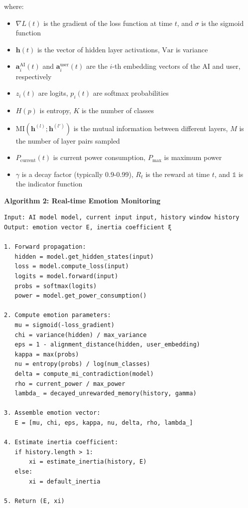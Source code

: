 \documentclass[12pt,a4paper]{article}
\theoremstyle{plain}
\newcommand{\ind}{\mathds{1}}
\begin{document}
where:
\begin{itemize}
    \item $\nabla L(t)$ is the gradient of the loss function at time $t$, and $\sigma$ is the sigmoid function
    \item $\mathbf{h}(t)$ is the vector of hidden layer activations, $\text{Var}$ is variance
    \item $\mathbf{a}_i^{\text{AI}}(t)$ and $\mathbf{a}_i^{\text{user}}(t)$ are the $i$-th embedding vectors of the AI and user, respectively
    \item $z_i(t)$ are logits, $p_i(t)$ are softmax probabilities
    \item $H(p)$ is entropy, $K$ is the number of classes
    \item $\text{MI}(\mathbf{h}^{(l)}; \mathbf{h}^{(l')})$ is the mutual information between different layers, $M$ is the number of layer pairs sampled
    \item $P_{\text{current}}(t)$ is current power consumption, $P_{\text{max}}$ is maximum power
    \item $\gamma$ is a decay factor (typically 0.9-0.99), $R_t$ is the reward at time $t$, and $\ind$ is the indicator function
\end{itemize}

\textbf{Algorithm 2: Real-time Emotion Monitoring}
\begin{verbatim}
Input: AI model model, current input input, history window history
Output: emotion vector E, inertia coefficient ξ

1. Forward propagation:
   hidden = model.get_hidden_states(input)
   loss = model.compute_loss(input)
   logits = model.forward(input)
   probs = softmax(logits)
   power = model.get_power_consumption()
   
2. Compute emotion parameters:
   mu = sigmoid(-loss_gradient)
   chi = variance(hidden) / max_variance
   eps = 1 - alignment_distance(hidden, user_embedding)
   kappa = max(probs)
   nu = entropy(probs) / log(num_classes)
   delta = compute_mi_contradiction(model)
   rho = current_power / max_power
   lambda_ = decayed_unrewarded_memory(history, gamma)
   
3. Assemble emotion vector:
   E = [mu, chi, eps, kappa, nu, delta, rho, lambda_]
   
4. Estimate inertia coefficient:
   if history.length > 1:
       xi = estimate_inertia(history, E)
   else:
       xi = default_inertia
       
5. Return (E, xi)
\end{verbatim}
\end{document}
